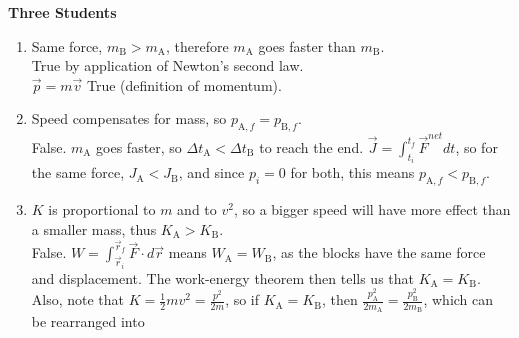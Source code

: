 \documentclass[]{article}
\begin{document}
\begin{TeacherMargin}
\begin{center}
	\large
\end{center}
\textbf{Three Students}
\begin{enumerate}[(1)]
	\item Same force, $m_{\text{B}}>m_{\text{A}}$, therefore $m_{\text{A}}$ goes faster than $m_{\text{B}}$. \\
	{\color{blue}True by application of Newton's second law.} \\
	$\vec{p}=m\vec{v}$ {\color{blue} True (definition of momentum).}
	\item Speed compensates for mass, so $p_{\text{A},f} = p_{\text{B},f}$. \\
	{\color{violet}False. $m_{\text{A}}$ goes faster, so $\Delta t_{\text{A}} < \Delta t_{\text{B}}$ to reach the end. $\vec{J} = \int_{t_{i}}^{t_{f}}\vec{F}^{net}dt$, so for the same force, $J_{\text{A}} < J_{\text{B}}$, and since $p_{i}=0$ for both, this means $p_{\text{A},f} < p_{\text{B},f}$.}
	\item $K$ is proportional to $m$ and to $v^{2}$, so a bigger speed will have more effect than a smaller mass, thus $K_{\text{A}}>K_{\text{B}}$. \\
	{\color{violet} False. $W = \int_{\vec{r}_{i}}^{\vec{r}_{f}}\vec{F}\cdot d\vec{r}$ means $W_{\text{A}} = W_{\text{B}}$, as the blocks have the same force and displacement. The work-energy theorem then tells us that $K_{\text{A}}=K_{\text{B}}$.} \\
	{\color{violet}Also, note that $K=\frac{1}{2}mv^{2}=\frac{p^{2}}{2m}$, so if $K_{\text{A}} = K_{\text{B}}$, then $\frac{p_{\text{A}}^{2}}{2m_{\text{A}}} = \frac{p_{\text{B}}^{2}}{2m_{\text{B}}}$, which can be rearranged into}
\end{enumerate}
\end{TeacherMargin}
\end{document}

